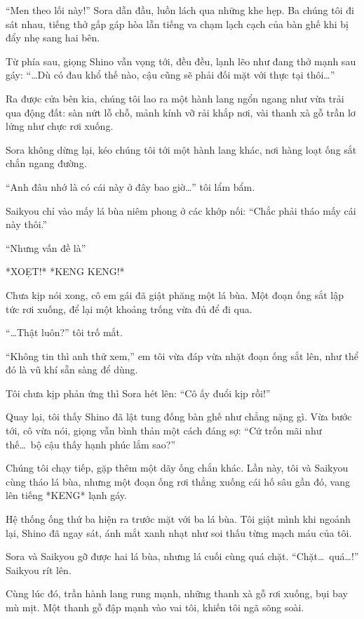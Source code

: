 \documentclass[../main.tex]{subfiles}
\begin{document}
``Men theo lối này!'' Sora dẫn đầu, luồn lách qua những khe hẹp. Ba chúng tôi đi sát nhau, tiếng thở gấp gáp hòa lẫn tiếng va chạm lạch cạch của bàn ghế khi bị đẩy nhẹ sang hai bên.

Từ phía sau, giọng Shino vẫn vọng tới, đều đều, lạnh lẽo như đang thở mạnh sau gáy: ``\dots Dù có đau khổ thế nào, cậu cũng sẽ phải đối mặt với thực tại thôi\dots''

Ra được cửa bên kia, chúng tôi lao ra một hành lang ngổn ngang như vừa trải qua động đất: sàn nứt lỗ chỗ, mảnh kính vỡ rải khắp nơi, vài thanh xà gỗ trần lơ lửng như chực rơi xuống.

Sora không dừng lại, kéo chúng tôi tới một hành lang khác, nơi hàng loạt ống sắt chắn ngang đường.


``Anh đâu nhớ là có cái này ở đây bao giờ\dots'' tôi lẩm bẩm.

Saikyou chỉ vào mấy lá bùa niêm phong ở các khớp nối: ``Chắc phải tháo mấy cái này thôi.''

``Nhưng vấn đề là''

*XOẸT!* *KENG KENG!*

Chưa kịp nói xong, cô em gái đã giật phăng một lá bùa. Một đoạn ống sắt lập tức rơi xuống, để lại một khoảng trống vừa đủ để đi qua.

``\dots Thật luôn?'' tôi trố mắt.

``Không tin thì anh thử xem,'' em tôi vừa đáp vừa nhặt đoạn ống sắt lên, như thể đó là vũ khí sẵn sàng để dùng.

Tôi chưa kịp phản ứng thì Sora hét lên: ``Cô ấy đuổi kịp rồi!''

Quay lại, tôi thấy Shino đã lật tung đống bàn ghế như chẳng nặng gì. Vừa bước tới, cô vừa nói, giọng vẫn bình thản một cách đáng sợ: ``Cứ trốn mãi như thế\dots\ bộ cậu thấy hạnh phúc lắm sao?''

Chúng tôi chạy tiếp, gặp thêm một dãy ống chắn khác. Lần này, tôi và Saikyou cùng tháo lá bùa, nhưng một đoạn ống rơi thẳng xuống cái hố sâu gần đó, vang lên tiếng *KENG* lạnh gáy.

Hệ thống ống thứ ba hiện ra trước mặt với ba lá bùa. Tôi giật mình khi ngoảnh lại, Shino đã ngay sát, ánh mắt xanh nhạt như soi thấu từng mạch máu của tôi.

Sora và Saikyou gỡ được hai lá bùa, nhưng lá cuối cùng quá chặt. ``Chặt\dots\ quá\dots!'' Saikyou rít lên.

Cùng lúc đó, trần hành lang rung mạnh, những thanh xà gỗ rơi xuống, bụi bay mù mịt. Một thanh gỗ đập mạnh vào vai tôi, khiến tôi ngã sõng soài.
\end{document}
